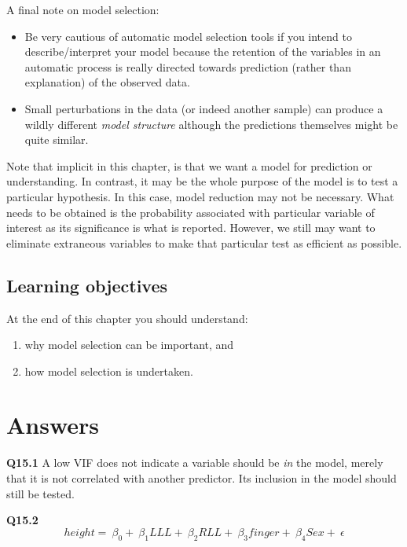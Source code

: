 \documentclass[
  oneside]{krantz}
\providecommand{\tightlist}{%
  \setlength{\itemsep}{0pt}\setlength{\parskip}{0pt}}
\begin{document}
A final note on model selection:

\begin{itemize}
\tightlist
\item
  Be very cautious of automatic model selection tools if you intend to describe/interpret your model because the retention of the variables in an automatic process is really directed towards prediction (rather than explanation) of the observed data.
\item
  Small perturbations in the data (or indeed another sample) can produce a wildly different \emph{model structure} although the predictions themselves might be quite similar.
\end{itemize}

Note that implicit in this chapter, is that we want a model for prediction or understanding. In contrast, it may be the whole purpose of the model is to test a particular hypothesis. In this case, model reduction may not be necessary. What needs to be obtained is the probability associated with particular variable of interest as its significance is what is reported. However, we still may want to eliminate extraneous variables to make that particular test as efficient as possible.

\hypertarget{learning-objectives-3}{%
\subsection{Learning objectives}\label{learning-objectives-3}}

At the end of this chapter you should understand:

\begin{enumerate}
\def\labelenumi{\arabic{enumi}.}
\tightlist
\item
  why model selection can be important, and
\item
  how model selection is undertaken.
\end{enumerate}

\hypertarget{ANSmodsel}{%
\section{Answers}\label{ANSmodsel}}

\textbf{Q15.1} A low VIF does not indicate a variable should be \emph{in} the model, merely that it is not correlated with another predictor. Its inclusion in the model should still be tested.

\textbf{Q15.2} \[
height=\ {\beta{}}_0+\ {\beta{}}_1LLL+\ {\beta{}}_2RLL+\ {\beta{}}_3finger+\
{\beta{}}_4Sex+\ \epsilon{}
\]
\end{document}
